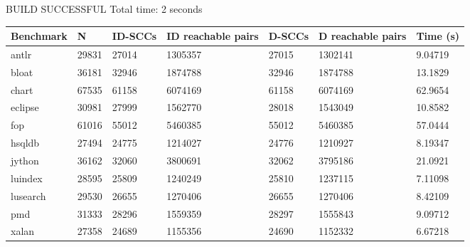 BUILD SUCCESSFUL
Total time: 2 seconds

\begin{table}[]
\begin{tabular}{|l|l|l|l|l|l|l|}
\hline
Benchmark & N & ID-SCCs & ID reachable pairs & D-SCCs & D reachable pairs & Time (s) \\ \hline

antlr & 29831 & 27014 & 1305357 & 27015 & 1302141 & 9.04719 \\ \hline

bloat & 36181 & 32946 & 1874788 & 32946 & 1874788 & 13.1829 \\ \hline

chart & 67535 & 61158 & 6074169 & 61158 & 6074169 & 62.9654 \\ \hline

eclipse & 30981 & 27999 & 1562770 & 28018 & 1543049 & 10.8582 \\ \hline

fop & 61016 & 55012 & 5460385 & 55012 & 5460385 & 57.0444 \\ \hline

hsqldb & 27494 & 24775 & 1214027 & 24776 & 1210927 & 8.19347 \\ \hline

jython & 36162 & 32060 & 3800691 & 32062 & 3795186 & 21.0921 \\ \hline

luindex & 28595 & 25809 & 1240249 & 25810 & 1237115 & 7.11098 \\ \hline

lusearch & 29530 & 26655 & 1270406 & 26655 & 1270406 & 8.42109 \\ \hline

pmd & 31333 & 28296 & 1559359 & 28297 & 1555843 & 9.09712 \\ \hline

xalan & 27358 & 24689 & 1155356 & 24690 & 1152332 & 6.67218 \\ \hline
\end{tabular}
\end{table}
